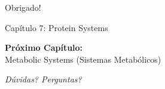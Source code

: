 \begin{frame}{}
\begin{center}
{\Huge Obrigado!}

\vspace{1cm}

{\Large Capítulo 7: Protein Systems}

\vspace{1cm}

\textbf{Próximo Capítulo:}\\
Metabolic Systems (Sistemas Metabólicos)

\vspace{1cm}

\textit{Dúvidas? Perguntas?}
\end{center}
\end{frame}


